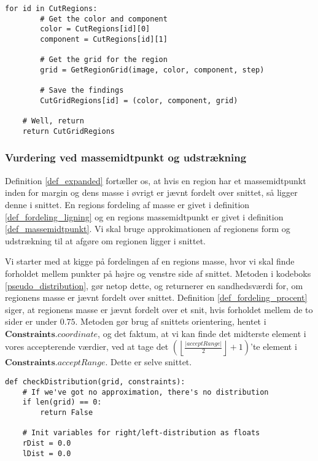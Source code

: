 {\begin{lstlisting}[caption={Metode, som finder approksimationen til alle
    regioner i en instans af $\angles{CutRegions}$.}, captionpos=b,
    label={pseudo_GridIt}, frame=tb,
    breaklines=false, float]
    for id in CutRegions:
        # Get the color and component
        color = CutRegions[id][0]
        component = CutRegions[id][1]

        # Get the grid for the region
        grid = GetRegionGrid(image, color, component, step)

        # Save the findings
        CutGridRegions[id] = (color, component, grid)

    # Well, return
    return CutGridRegions
\end{lstlisting}

\subsubsection{Vurdering ved massemidtpunkt og udstrækning}
Definition \ref{def_expanded} fortæller os, at hvis en region har et
massemidtpunkt inden for margin og dens masse i øvrigt er jævnt fordelt
over snittet, så ligger denne i snittet.  En regions fordeling af masse
er givet i definition \ref{def_fordeling_ligning} og en regions
massemidtpunkt er givet i definition \ref{def_massemidtpunkt}. Vi skal
bruge approkimationen af regionens form og udstrækning til at afgøre om
regionen ligger i snittet.

Vi starter med at kigge på fordelingen af en regions masse, hvor vi skal
finde forholdet mellem punkter på højre og venstre side af snittet.
Metoden i kodeboks \ref{pseudo_distribution}, gør netop dette, og
returnerer en sandhedsværdi for, om regionens masse er jævnt fordelt
over snittet. Definition \ref{def_fordeling_procent} siger, at regionens
masse er jævnt fordelt over et snit, hvis forholdet mellem de to sider
er under $0.75$.  Metoden gør brug af snittets orientering, hentet i
$\textbf{Constraints}.\textit{coordinate}$, og det faktum, at vi kan
finde det midterste element i vores accepterende værdier, ved at tage
det $\left(\left\lfloor \frac{|\textit{acceptRange}|}{2}\right\rfloor +
1\right)$'te element i $\textbf{Constraints}.\textit{acceptRange}$.
Dette er selve snittet.

\begin{lstlisting}[caption={Metode som, på baggrund af regionens
    fordeling af masse, afgør, om denne region er jævnt fordelt},
    captionpos=b, label={pseudo_distribution}, frame=tb,
    breaklines=false, float]
def checkDistribution(grid, constraints):
    # If we've got no approximation, there's no distribution
    if len(grid) == 0:
        return False

    # Init variables for right/left-distribution as floats
    rDist = 0.0
    lDist = 0.0


\end{lstlisting}}
